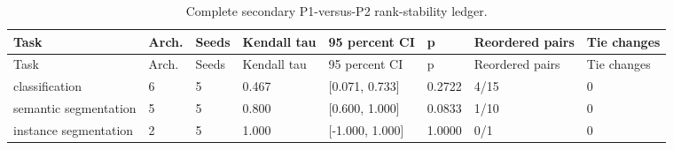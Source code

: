 \begin{longtable}{p{3.2cm}p{1.3cm}p{1.0cm}p{1.7cm}p{2.3cm}p{1.2cm}p{1.8cm}p{1.4cm}}
\caption{Complete secondary P1-versus-P2 rank-stability ledger.}\label{tab:all-rank-results}\\
\toprule
Task & Arch. & Seeds & Kendall tau & 95 percent CI & p & Reordered pairs & Tie changes \\
\midrule
\endfirsthead
\toprule
Task & Arch. & Seeds & Kendall tau & 95 percent CI & p & Reordered pairs & Tie changes \\
\midrule
\endhead
\bottomrule
\endfoot
classification & 6 & 5 & 0.467 & [0.071, 0.733] & 0.2722 & 4/15 & 0 \\ 
semantic segmentation & 5 & 5 & 0.800 & [0.600, 1.000] & 0.0833 & 1/10 & 0 \\ 
instance segmentation & 2 & 5 & 1.000 & [-1.000, 1.000] & 1.0000 & 0/1 & 0 \\ 
\end{longtable}
